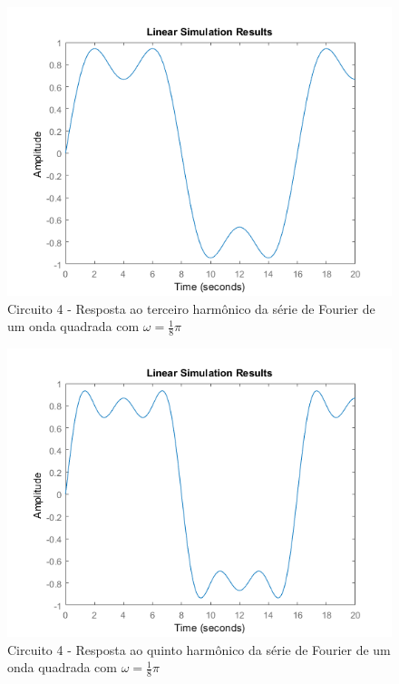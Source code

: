 \documentclass[a4paper, 12pt]{article}
\begin{document}
			\begin{figure}[!ht]
				\centering
				\includegraphics[scale=0.71]{img/1k_circ4.png}
				\caption{Circuito 4 - Resposta ao terceiro harmônico da série de Fourier de um onda quadrada com $\omega = \frac{1}{8}\pi$}	
			\end{figure}			
			\begin{figure}[!ht]
				\centering
				\includegraphics[scale=0.71]{img/1l_circ4.png}
				\caption{Circuito 4 - Resposta ao quinto harmônico da série de Fourier de um onda quadrada com $\omega = \frac{1}{8}\pi$}	
			\end{figure}		
\end{document}
